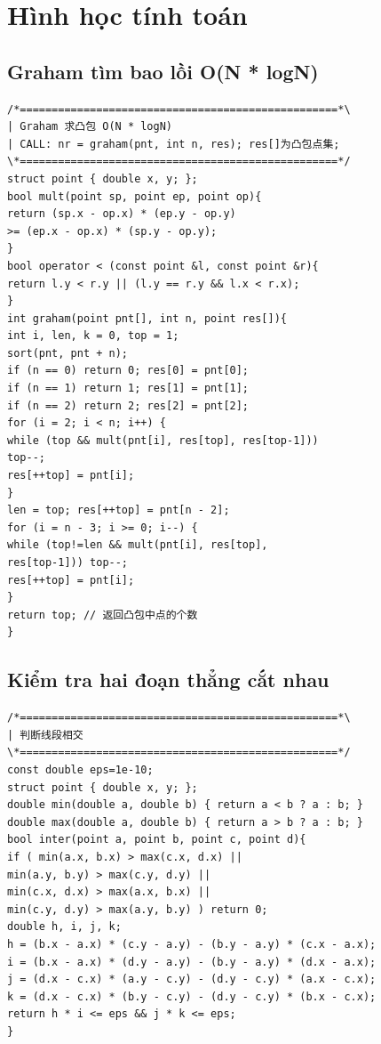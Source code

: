 \documentclass[11pt]{article}
\begin{document}
\section{Hình học tính toán}

\subsection{Graham tìm bao lồi O(N * logN)}

\begingroup
\scriptsize
\begin{verbatim}
/*==================================================*\
| Graham 求凸包 O(N * logN)
| CALL: nr = graham(pnt, int n, res); res[]为凸包点集;
\*==================================================*/
struct point { double x, y; };
bool mult(point sp, point ep, point op){
return (sp.x - op.x) * (ep.y - op.y)
>= (ep.x - op.x) * (sp.y - op.y);
}
bool operator < (const point &l, const point &r){
return l.y < r.y || (l.y == r.y && l.x < r.x);
}
int graham(point pnt[], int n, point res[]){
int i, len, k = 0, top = 1;
sort(pnt, pnt + n);
if (n == 0) return 0; res[0] = pnt[0];
if (n == 1) return 1; res[1] = pnt[1];
if (n == 2) return 2; res[2] = pnt[2];
for (i = 2; i < n; i++) {
while (top && mult(pnt[i], res[top], res[top-1]))
top--;
res[++top] = pnt[i];
}
len = top; res[++top] = pnt[n - 2];
for (i = n - 3; i >= 0; i--) {
while (top!=len && mult(pnt[i], res[top],
res[top-1])) top--;
res[++top] = pnt[i];
}
return top; // 返回凸包中点的个数
}
\end{verbatim}
\endgroup

\subsection{Kiểm tra hai đoạn thẳng cắt nhau}

\begingroup
\scriptsize
\begin{verbatim}
/*==================================================*\
| 判断线段相交
\*==================================================*/
const double eps=1e-10;
struct point { double x, y; };
double min(double a, double b) { return a < b ? a : b; }
double max(double a, double b) { return a > b ? a : b; }
bool inter(point a, point b, point c, point d){
if ( min(a.x, b.x) > max(c.x, d.x) ||
min(a.y, b.y) > max(c.y, d.y) ||
min(c.x, d.x) > max(a.x, b.x) ||
min(c.y, d.y) > max(a.y, b.y) ) return 0;
double h, i, j, k;
h = (b.x - a.x) * (c.y - a.y) - (b.y - a.y) * (c.x - a.x);
i = (b.x - a.x) * (d.y - a.y) - (b.y - a.y) * (d.x - a.x);
j = (d.x - c.x) * (a.y - c.y) - (d.y - c.y) * (a.x - c.x);
k = (d.x - c.x) * (b.y - c.y) - (d.y - c.y) * (b.x - c.x);
return h * i <= eps && j * k <= eps;
}
\end{verbatim}
\endgroup
\end{document}
